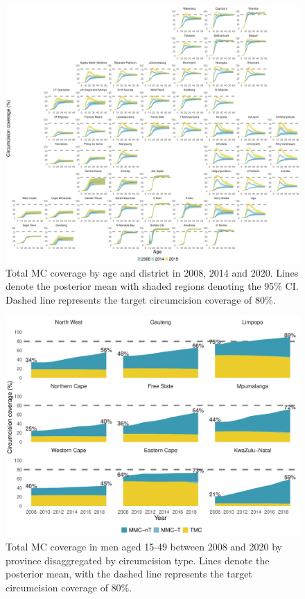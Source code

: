 \documentclass{article}
\begin{document}
\begin{appendix}
\begin{figure}[H]
	\centering
	\includegraphics[width = \linewidth]{Figures/suppmat/Coverage/MCcoverage_SingleAge_District.pdf}
	\caption{Total MC coverage by age and district in 2008, 2014 and 2020. Lines denote the posterior mean with shaded regions denoting the 95\% CI. Dashed line represents the target circumcision coverage of 80\%.}
\end{figure}	


\begin{figure}[H]
	\centering
	\includegraphics[width = \linewidth]{Figures/suppmat/Coverage/Coverage_1549_Province.pdf}
	\caption{Total MC coverage in men aged 15-49 between 2008 and 2020 by province disaggregated by circumcision type. Lines denote the posterior mean, with the dashed line represents the target circumcision coverage of 80\%.}
\end{figure}


\end{appendix}
\end{document}
